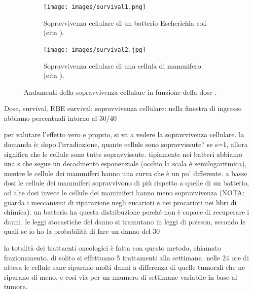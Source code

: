 \documentclass[12pt,a4paper,twoside]{report}
\begin{document}
	\begin{figure}[H]
		\centering
		\begin{subfigure}[t]{0.49\textwidth}
			\centering
			\texttt{[image: images/survival1.png]}
			\caption{Sopravvivenza cellulare di un batterio Escherichia coli (cita
				).}
			\label{fig:survival1}
		\end{subfigure}
		\hfill
		\begin{subfigure}[t]{0.49\textwidth}
			\centering
			\texttt{[image: images/survival2.jpg]}
			\caption{Sopravvivenza cellulare di una cellula di mammifero (cita
				).}
			\label{fig:survival2}
		\end{subfigure}
		\caption{Andamenti della sopravvivenza cellulare in funzione della dose .}
	\end{figure}
	
	
	Dose, survival, RBE	
	survival: sopravvivenza cellulare: nella finestra di ingresso abbiamo percentuali intorno al 30/40%
	
	per valutare l'effetto vero e proprio, si va a vedere la sopravvivenza cellulare. la domanda è: dopo l'irradiazione, quante cellule sono sopravvissute? se s=1, allora significa che le cellule sono tutte sopravvissute. tipiamente nei batteri abbiamo una s che segue un decadmento esponenziale (occhio la scala è semilogaritmica), mentre le cellule dei mammiferi hanno una curva che è un po' differente. a basse dosi le cellule dei mammiferi sopravvivono di più rispetto a quelle di un batterio, ad alte dosi invece le cellule dei mammiferi hanno meno sopravvivenza (NOTA: guarda i meccanismi di riparazione negli eucarioti e nei procarioti nei libri di chimica). un batterio ha questa distribuzione perché non è capace di recuperare i danni. le leggi stocastiche del danno si tramutano in leggi di poisson, secondo le quali se io ho la probabilità di fare un danno del 30%
	
	la totalità dei trattaenti  oncologici è fatta con questo metodo, chiamato frazionamento. di solito si effettuano 5 trattamenti alla settimana. nelle 24 ore di attesa le cellule sane riparano molti danni a differenza di quelle tumorali che ne riparano di meno, e così via per un nnumero di settimane variabile in base al tumore.
	
\end{document}
